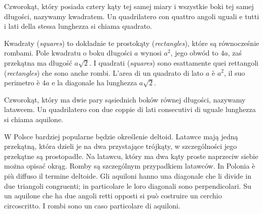 \begin{definition}
[kwadrat] %
[quadrato] %
Czworokąt, który posiada cztery kąty tej samej miary i wszystkie boki tej samej długości, nazywamy kwadratem. %
Un quadrilatero con quattro angoli uguali e tutti i lati della stessa lunghezza si chiama quadrato. %
\end{definition}

Kwadraty (\emph{squares}) to dokładnie te prostokąty (\emph{rectangles}), które są równocześnie rombami. %
Pole kwadratu o boku długości $a$ wynosi $a^2$, jego obwód to $4a$, zaś przekątna ma długość $a \sqrt 2$. %
I quadrati (\emph{squares}) sono esattamente quei rettangoli (\emph{rectangles}) che sono anche rombi. %
L’area di un quadrato di lato $a$ è $a^2$, il suo perimetro è $4a$ e la diagonale ha lunghezza $a \sqrt 2$. %

\begin{definition}
[latawiec] %
[aquilone] %
Czworokąt, który ma dwie pary sąsiednich boków równej długości, nazywamy latawcem. %
Un quadrilatero con due coppie di lati consecutivi di uguale lunghezza si chiama aquilone. %
\end{definition}

W Polsce bardziej popularne będzie określenie deltoid. %
Latawce mają jedną przekątną, która dzieli je na dwa przystające trójkąty, w szczególności jego przekątne są prostopadłe. %
Na latawcu, który ma dwa kąty proste naprzeciw siebie można opisać okrąg. %
Romby są szczególnym przypadkiem latawców. %
In Polonia è più diffuso il termine deltoide. %
Gli aquiloni hanno una diagonale che li divide in due triangoli congruenti; in particolare le loro diagonali sono perpendicolari. %
Su un aquilone che ha due angoli retti opposti si può costruire un cerchio circoscritto. %
I rombi sono un caso particolare di aquiloni. %


